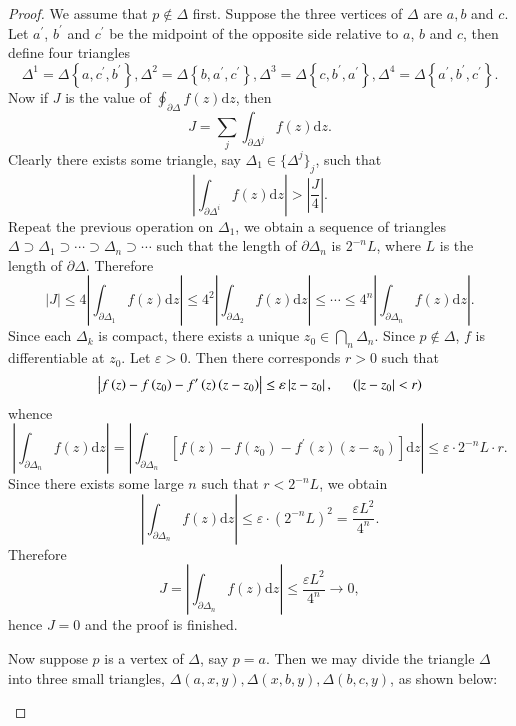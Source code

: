 \begin{proof}
We assume that $p\notin\Delta$ first. Suppose the three vertices of $\Delta$ are $a,b$ and $c$. Let $a^\prime$, $b^\prime$ and $c^\prime$ be the midpoint of the opposite side relative to $a$, $b$ and $c$, then define four triangles 
$$
\Delta ^1=\Delta \left\{ a,c^{\prime},b^{\prime} \right\} ,\Delta ^2=\Delta \left\{ b,a^{\prime},c^{\prime} \right\} ,\Delta ^3=\Delta \left\{ c,b^{\prime},a^{\prime} \right\} ,\Delta ^4=\Delta \left\{ a^{\prime},b^{\prime},c^{\prime} \right\}. 
$$
Now if $J$ is the value of $\oint_{\partial\Delta}f(z)\mathrm{d}z$, then 
$$
J=\sum_j{\int_{\partial \Delta ^j}{f\left( z \right) \mathrm{d}z}}.
$$
Clearly there exists some triangle, say $\Delta_1\in\{\Delta^j\}_j$, such that 
$$
\left| \int_{\partial \Delta ^i}{f\left( z \right) \mathrm{d}z} \right|>\left| \frac{J}{4} \right|.
$$
Repeat the previous operation on $\Delta_1$, we obtain a sequence of triangles $\Delta \supset \Delta _1\supset \cdots \supset \Delta _n\supset \cdots $ such that the length of $\partial\Delta_n$ is $2^{-n}L$, where $L$ is the length of $\partial\Delta$. Therefore 
$$
\left| J \right|\le 4\left| \int_{\partial \Delta _1}{f\left( z \right) \mathrm{d}z} \right|\le 4^2\left| \int_{\partial \Delta _2}{f\left( z \right) \mathrm{d}z} \right|\le \cdots \le 4^n\left| \int_{\partial \Delta _n}{f\left( z \right) \mathrm{d}z} \right|.
$$
Since each $\Delta_k$ is compact, there exists a unique $z_0\in\bigcap_{n}\Delta_n$. Since $p\notin\Delta$, $f$ is differentiable at $z_0$. Let $\varepsilon>0$. Then there corresponds $r>0$ such that 
$$
\left| f\left( z \right) -f\left( z_0 \right) -f^{\prime}\left( z \right) \left( z-z_0 \right) \right|\le \varepsilon \left| z-z_0 \right|,\hspace{0.5cm}\left( \left| z-z_0 \right|<r \right) 
$$
whence 
$$
\left| \int_{\partial \Delta _n}{f\left( z \right) \mathrm{d}z} \right|=\left| \int_{\partial \Delta _n}{\left[ f\left( z \right) -f\left( z_0 \right) -f^{\prime}\left( z \right) \left( z-z_0 \right) \right] \mathrm{d}z} \right|\le \varepsilon \cdot 2^{-n}L\cdot r.
$$
Since there exists some large $n$ such that $r<2^{-n}L$, we obtain 
$$
\left| \int_{\partial \Delta _n}{f\left( z \right) \mathrm{d}z} \right|\le \varepsilon \cdot \left( 2^{-n}L \right) ^2=\frac{\varepsilon L^2}{4^n}.
$$
Therefore 
$$
J=\left| \int_{\partial \Delta _n}{f\left( z \right) \mathrm{d}z} \right|\le \frac{\varepsilon L^2}{4^n}\rightarrow 0,
$$
hence $J=0$ and the proof is finished.\par
Now suppose $p$ is a vertex of $\Delta$, say $p=a$. Then we may divide the triangle $\Delta$ into three small triangles, $\Delta \left( a,x,y \right) ,\Delta \left( x,b,y \right) ,\Delta \left( b,c,y \right) $, as shown below:
\begin{center}



\end{center}
\end{proof}
